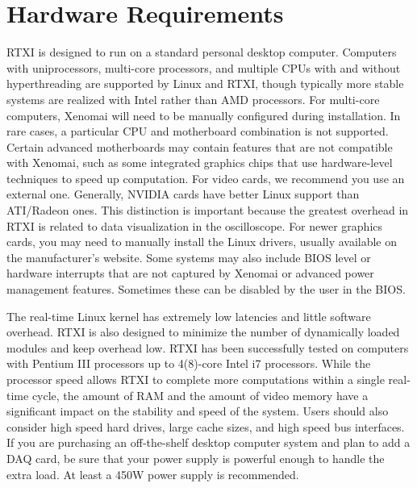 \section{Hardware Requirements}

 
RTXI is designed to run on a standard personal desktop computer. Computers with uniprocessors, multi-core processors, and multiple CPUs with and without hyperthreading are supported by Linux and RTXI, though typically more stable systems are realized with Intel rather than AMD processors. For multi-core computers, Xenomai will need to be manually configured during installation. In rare cases, a particular CPU and motherboard combination is not supported. Certain advanced motherboards may contain features that are not compatible with Xenomai, such as some integrated graphics chips that use hardware-level techniques to speed up computation. For video cards, we recommend you use an external one. Generally, NVIDIA cards have better Linux support than ATI/Radeon ones. This distinction is important because the greatest overhead in RTXI is related to data visualization in the oscilloscope. For newer graphics cards, you may need to manually install the Linux drivers, usually available on the manufacturer's website. Some systems may also include BIOS level or hardware interrupts that are not captured by Xenomai or advanced power management features. Sometimes these can be disabled by the user in the BIOS.

The real-time Linux kernel has extremely low latencies and little software overhead. RTXI is also designed to minimize the number of dynamically loaded modules and keep overhead low. RTXI has been successfully tested on computers with Pentium III processors up to 4(8)-core Intel i7 processors. While the processor speed allows RTXI to complete more computations within a single real-time cycle, the amount of RAM and the amount of video memory have a significant impact on the stability and speed of the system. Users should also consider high speed hard drives, large cache sizes, and high speed bus interfaces. If you are purchasing an off-the-shelf desktop computer system and plan to add a DAQ card, be sure that your power supply is powerful enough to handle the extra load. At least a 450W power supply is recommended.